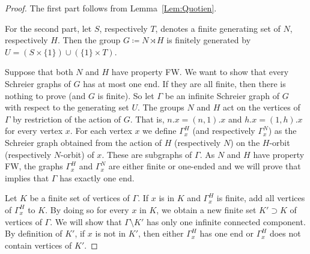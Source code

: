 \documentclass[a4paper]{article}
\theoremstyle{definition}
\theoremstyle{remark}
\begin{document}
\begin{proof}
The first part follows from Lemma~\ref{Lem:Quotien}.

For the second part, let $S$, respectively $T$, denotes a finite generating set of $N$, respectively $H$.
Then the group $G\coloneqq N\rtimes H$ is finitely generated by $U=(S\times\{1\}) \cup(\{1\}\times T)$.


Suppose that both $N$ and $H$ have property FW. We want to show that every Schreier graphs of $G$ has at most one end. If they are all finite, then there is nothing to prove (and $G$ is finite). So let $\Gamma$ be an infinite Schreier graph of $G$ with respect to the generating set $U$. The groups $N$ and $H$ act on the vertices of $\Gamma$ by restriction of the action of $G$. That is, $n.x = (n,1).x$ and $h.x = (1,h).x$ for every vertex $x$.
For each vertex $x$ we define $\Gamma_x^H$ (and respectively $\Gamma_x^N$) as the Schreier graph obtained from the action of $H$ (respectively $N$) on the $H$-orbit (respectively $N$-orbit) of $x$. These are subgraphs of $\Gamma$. As $N$ and $H$ have property FW, the graphs $\Gamma_x^H$ and $\Gamma_x^N$ are either finite or one-ended and we will prove that implies that $\Gamma$ has exactly one end.

Let $K$ be a finite set of vertices of $\Gamma$.
If $x$ is in $K$ and $\Gamma_x^H$ is finite, add all vertices of $\Gamma_x^H$ to $K$.
By doing so for every $x$ in $K$, we obtain a new finite set $K' \supset K$ of vertices of $\Gamma$.
We will show that $\Gamma\setminus K'$ has only one infinite connected component.
By definition of $K'$, if $x$ is not in $K'$, then either $\Gamma_x^H$ has one end or $\Gamma_x^H$ does not contain vertices of $K'$.


\end{proof}
\end{document}
